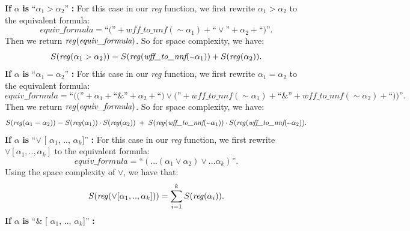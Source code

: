 \documentclass[runningheads]{llncs}
\begin{document}
\textbf{If} $\alpha$ \textbf{is} ``$\alpha_{1} >  \alpha_{2}$'' \textbf{:}
    For this case in our \emph{reg} function, we first rewrite $\alpha_{1} > \alpha_{2}$ to the equivalent formula:
    \[ 
    \textit{equiv\_formula} = \text{``(''} + \textit{wff\_to\_nnf}(\scriptstyle{\sim}\textstyle \alpha_{1}) + \text{``} \lor \text{''} + \alpha_{2} + \text{``)''}.
    \]
    Then we return $\text{\emph{reg}}(\textit{equiv\_formula})$.
    So for space complexity, we have:
    \[ 
    S(\text{\emph{reg}}(\alpha_{1} > \alpha_{2})) = S(\text{\emph{reg}}(\textit{wff\_to\_nnf}(\scriptstyle{\sim}\textstyle \alpha_{1})) + S(\text{\emph{reg}}(\alpha_{2})).
    \]
\textbf{If} $\alpha$ \textbf{is} ``$\alpha_{1} = \alpha_{2}$'' \textbf{:}
    For this case in our \emph{reg} function, we first rewrite $\alpha_{1} = \alpha_{2}$ to the equivalent formula:
    \[ 
    \textit{equiv\_formula} = 
    \text{``((''} + \alpha_{1} + \text{``} \& \text{''} + \alpha_{2} + \text{``)}
    \lor 
    \text{(''} + \textit{wff\_to\_nnf}(\scriptstyle{\sim}\textstyle \alpha_{1}) + \text{``} \& \text{''} +  \textit{wff\_to\_nnf}(\scriptstyle{\sim}\textstyle \alpha_{2}) + \text{``))''}.
    \]
    Then we return $\text{\emph{reg}}(\textit{equiv\_formula})$.
    So for space complexity, we have:
    \[ 
    S(\text{\emph{reg}}(\alpha_{1} = \alpha_{2})) =
    S(\text{\emph{reg}}(\alpha_{1})) \cdot S(\text{\emph{reg}}(\alpha_{2})) \; + \;  
    S(\text{\emph{reg}}(\textit{wff\_to\_nnf}(\scriptstyle{\sim}\textstyle \alpha_{1})) \cdot S(\text{\emph{reg}}(\textit{wff\_to\_nnf}(\scriptstyle{\sim}\textstyle \alpha_{2})).
    \]
\textbf{If} $\alpha$ \textbf{is} ``$\lor$ [ $\alpha_{1}$, .., $\alpha_{k}$]'' \textbf{:} 
For this case in our \emph{reg} function, we first rewrite $\lor [\alpha_{1}, .., \alpha_{k}]$ to the equivalent formula:
    \[ 
    \textit{equiv\_formula} = \text{``}( ... (\alpha_{1} \lor \alpha_{2}) \lor ... \alpha_{k})\text{''}.
    \]
Using the space complexity of $\lor$, we have that:
    \[
    S(\text{\emph{reg}}(\lor [\alpha_{1}, .., \alpha_{k}])) = 
    \sum_{i=1}^{k} S(\text{\emph{reg}}(\alpha_{i})).
    \]
\textbf{If} $\alpha$ \textbf{is} ``$\&$ [ $\alpha_{1}$, .., $\alpha_{k}$]'' \textbf{:} 
\end{document}

